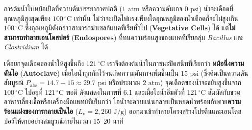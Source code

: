 การต้มน้ำในหม้อเปิดที่ความดันบรรยากาศปกติ ($1\text{ atm}$ หรือความดันเกจ $0\text{ psi}$) น้ำจะเดือดที่อุณหภูมิสูงสุดเพียง $100\,^\circ\text{C}$ เท่านั้น ไม่ว่าจะเปิดไฟแรงเพียงใดอุณหภูมิของน้ำเดือดก็จะไม่สูงเกิน $100\,^\circ\text{C}$ ซึ่งอุณหภูมิดังกล่าวสามารถฆ่าเซลล์แบคทีเรียทั่วไป (\textbf{Vegetative Cells}) ได้ แต่\textbf{ไม่สามารถทำลายเอนโดสปอร์} (\textbf{Endospores}) ที่ทนความร้อนสูงของแบคทีเรียกลุ่ม \textit{Bacillus} และ \textit{Clostridium} ได้

เพื่อยกจุดเดือดของน้ำให้สูงขึ้นถึง $121\,^\circ\text{C}$ เราจึงต้องต้มน้ำในภาชนะปิดสนิทที่เรียกว่า \textbf{หม้อนึ่งความดันไอ} (\textbf{Autoclave}) เมื่อไอน้ำถูกกักไว้จนเกิดความดันเกจเพิ่มขึ้นเป็น $15\text{ psi}$ (ซึ่งคิดเป็นความดันสัมบูรณ์ $P_{\text{abs}} = 14.7 + 15 \approx 29.7\text{ psi}$ หรือประมาณ $2\text{ atm}$) จุดเดือดของน้ำจะขยับสูงขึ้นจาก $100\,^\circ\text{C}$ ไปอยู่ที่ $121\,^\circ\text{C}$ พอดี ดังแสดงใน\mbox{ภาพที่} 6.1 และเมื่อไอน้ำอิ่มตัวที่ $121\,^\circ\text{C}$ สัมผัสกับขวดอาหารเลี้ยงเชื้อหรือเครื่องมือแพทย์ที่เย็นกว่า ไอน้ำจะควบแน่นกลายเป็นหยดน้ำพร้อมกับคาย\textbf{ความร้อนแฝงของการกลายเป็นไอ} ($L_v = 2{,}260\text{ J/g}$) ออกมาเข้าทำลายโครงสร้างโปรตีนและเอนโดสปอร์ให้ตายอย่างสมบูรณ์ภายในเวลา 15--20 นาที

